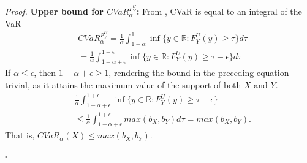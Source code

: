\documentclass[letterpaper]{article} %
\newenvironment{proof}{\noindent\textit{Proof.}}{\hfill$\square$}
\begin{document}
\begin{proof}
	\textbf{Upper bound for $CVaR_\alpha^{F_Y^U}$:} From \cite{acerbi2002coherence}, CVaR is equal to an integral of the VaR
	\begin{equation}
		\begin{aligned}
			&CVaR_\alpha^{F_Y^U}=\frac{1}{\alpha}\int_{1-\alpha}^1 \inf \{y\in \mathbb{R}:F_Y^U(y)\geq \tau\} d\tau \\
			&=\frac{1}{\alpha}\int_{1-\alpha+\epsilon}^{1+\epsilon} \inf \{y\in \mathbb{R}:F_Y^U(y)\geq \tau -\epsilon\} d\tau
		\end{aligned}
	\end{equation}  
	If $\alpha \leq \epsilon$, then $1 - \alpha + \epsilon \geq 1$, rendering the bound in the preceding equation trivial, as it attains the maximum value of the support of both $X$ and $Y$.
	\begin{equation}\label{eq:helper1}
		\begin{aligned}
			&\frac{1}{\alpha}\int_{1-\alpha+\epsilon}^{1+\epsilon} \inf \{y\in \mathbb{R}:F_Y^U(y)\geq \tau -\epsilon\} \\
			&\leq \frac{1}{\alpha}\int_{1-\alpha+\epsilon}^{1+\epsilon} max(b_X, b_Y)d\tau = max(b_X, b_Y).
		\end{aligned}
	\end{equation}
	That is, $CVaR_\alpha(X)\leq max(b_X, b_Y)$.
	

\end{proof}
\end{document}
